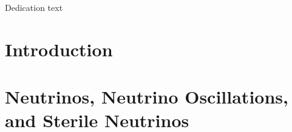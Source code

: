 \documentclass[11pt,openright,twoside,letterpaper,onecolumn]{report} %
\begin{document}
\linenumbers %

\pagestyle{empty}

\thesistitlepage
\thesiscopyrightpage

\thesisabstract


\pagestyle{plain}

\setlength{\footskip}{0.5in}

\setcounter{tocdepth}{2}
\renewcommand{\contentsname}{Table of Contents}
\tableofcontents
\cleardoublepage

\listoffigures
\cleardoublepage


\cleardoublepage

\thispagestyle{plain}
\strut \vfill
\centerline{\LARGE 
Dedication text
}
\vfill \strut
\cleardoublepage


\pagestyle{headings}

%
%
\setlength{\textheight}{8.5in}
\setlength{\footskip}{0in}




 {%
\fancyhf{}
\fancyhead[LE,RO]{\thepage}
\fancyhead[RE,LO]{\itshape \leftmark}
\renewcommand{\headrulewidth}{0pt}
}
\pagestyle{plain}

\chapter{Introduction}
\label{section:intro}


\chapter{Neutrinos, Neutrino Oscillations, and Sterile Neutrinos}
\label{sec:theory}

\end{document}
